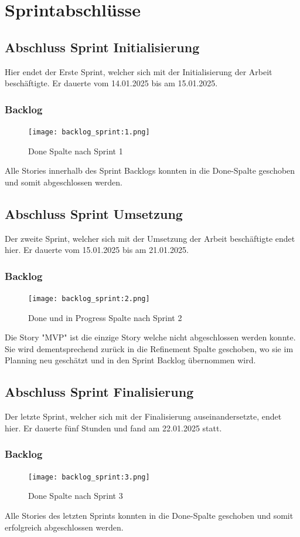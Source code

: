 

\chapter{Sprintabschlüsse}

\section{Abschluss Sprint Initialisierung}
Hier endet der Erste Sprint, welcher sich mit der Initialisierung der Arbeit
beschäftigte. Er dauerte vom 14.01.2025 bis am 15.01.2025.

\subsection{Backlog}
\begin{figure}[h]
   \centering
   \texttt{[image: backlog\_sprint:1.png]}
   \caption{Done Spalte nach Sprint 1}
\end{figure}
Alle Stories innerhalb des Sprint Backlogs konnten in die Done-Spalte geschoben und somit abgeschlossen
werden.

\newpage

\section{Abschluss Sprint Umsetzung}
Der zweite Sprint, welcher sich mit der Umsetzung der Arbeit beschäftigte endet hier. Er dauerte vom 
15.01.2025 bis am 21.01.2025.

\subsection{Backlog}
\begin{figure}[h]
   \centering
   \texttt{[image: backlog\_sprint:2.png]}
   \caption{Done und in Progress Spalte nach Sprint 2}
\end{figure}

Die Story "MVP" ist die einzige Story welche nicht abgeschlossen werden konnte. Sie wird dementsprechend zurück in die Refinement
Spalte geschoben, wo sie im Planning neu geschätzt und in den Sprint Backlog übernommen wird.  

\section{Abschluss Sprint Finalisierung}
Der letzte Sprint, welcher sich mit der Finalisierung auseinandersetzte, endet hier. Er dauerte fünf Stunden und fand am
22.01.2025 statt.

\subsection{Backlog}
\begin{figure}[h]
   \centering
   \texttt{[image: backlog\_sprint:3.png]}
   \caption{Done Spalte nach Sprint 3}
\end{figure}

Alle Stories des letzten Sprints konnten in die Done-Spalte geschoben und somit erfolgreich
abgeschlossen werden.



